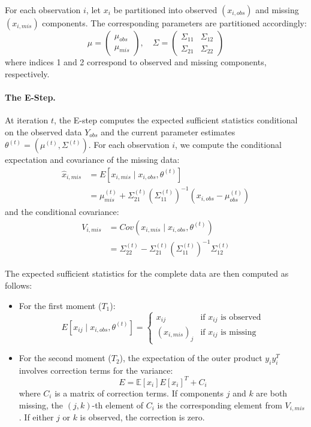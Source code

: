 \documentclass[11pt, a4paper]{article}
\begin{document}
For each observation $i$, let $x_i$ be partitioned into observed $(x_{i,obs})$ and missing $(x_{i,mis})$ components.
The corresponding parameters are partitioned accordingly:
\begin{equation}
\mu = \begin{pmatrix} \mu_{obs} \\ \mu_{mis} \end{pmatrix}, \quad 
\Sigma = \begin{pmatrix} \Sigma_{11} & \Sigma_{12} \\ \Sigma_{21} & \Sigma_{22} \end{pmatrix}
\end{equation}
where indices 1 and 2 correspond to observed and missing components, respectively.

\paragraph{The E-Step.}
At iteration $t$, the E-step computes the expected sufficient statistics conditional on the observed data $Y_{obs}$ and the current parameter estimates $\theta^{(t)} = (\mu^{(t)}, \Sigma^{(t)})$.
For each observation $i$, we compute the conditional expectation and covariance of the missing data:
\begin{align}
\hat{x}_{i,mis} &= E[x_{i,mis} \mid x_{i,obs}, \theta^{(t)}] \\
&= \mu_{mis}^{(t)} + \Sigma_{21}^{(t)} (\Sigma_{11}^{(t)})^{-1} (x_{i,obs} - \mu_{obs}^{(t)})
\end{align}
and the conditional covariance:
\begin{align}
V_{i,mis} &= Cov(x_{i,mis} \mid x_{i,obs}, \theta^{(t)}) \\
&= \Sigma_{22}^{(t)} - \Sigma_{21}^{(t)} (\Sigma_{11}^{(t)})^{-1} \Sigma_{12}^{(t)}
\end{align}

The expected sufficient statistics for the complete data are then computed as follows:
\begin{itemize}
    \item For the first moment ($T_1$):
    \begin{equation}
    E[x_{ij} \mid x_{i,obs}, \theta^{(t)}] = 
    \begin{cases} 
    x_{ij} & \text{if } x_{ij} \text{ is observed} \\
    (\hat{x}_{i,mis})_j & \text{if } x_{ij} \text{ is missing}
    \end{cases}
    \end{equation}
    
    \item For the second moment ($T_2$), the expectation of the outer product $y_i y_i^T$ involves correction terms for the variance:
    \begin{equation}
    E = \mathbb{E}[x_i] E[x_i]^T + C_i
    \end{equation}
    where $C_i$ is a matrix of correction terms.
If components $j$ and $k$ are both missing, the $(j,k)$-th element of $C_i$ is the corresponding element from $V_{i,mis}$.
If either $j$ or $k$ is observed, the correction is zero.
\end{itemize}
\end{document}
